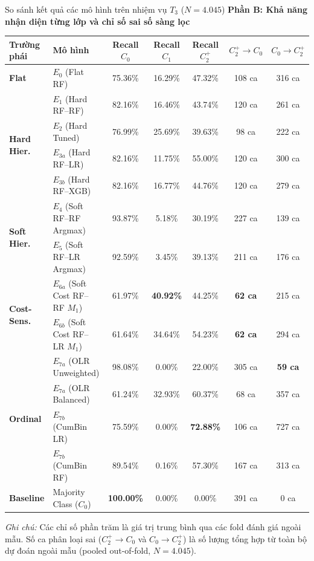 \begin{table}{So sánh kết quả các mô hình trên nhiệm vụ $T_3$ ($N = 4.045$)}
\vspace{0.35cm}
\textbf{Phần B: Khả năng nhận diện từng lớp và chỉ số sai số sàng lọc}
\vspace{0.15cm}

\begin{tabularx}{\textwidth}{l X c c c c c}
\toprule
\textbf{Trường phái} & \textbf{Mô hình} & \textbf{Recall $C_0$} & \textbf{Recall $C_1$} & \textbf{Recall $C_2^+$} & \textbf{$C_2^+ \to C_0$} & \textbf{$C_0 \to C_2^+$} \\
\midrule
\textbf{Flat} & $E_0$ (Flat RF) & 75.36\% & 16.29\% & 47.32\% & 108 ca & 316 ca \\
\midrule
\multirow{4}{*}{\textbf{Hard Hier.}} 
  & $E_1$ (Hard RF--RF)   & 82.16\% & 16.46\% & 43.74\% & 120 ca & 261 ca \\
  & $E_2$ (Hard Tuned)    & 76.99\% & 25.69\% & 39.63\% & 98 ca & 222 ca \\
  & $E_{3a}$ (Hard RF--LR) & 82.16\% & 11.75\% & 55.00\% & 120 ca & 300 ca \\
  & $E_{3b}$ (Hard RF--XGB)& 82.16\% & 16.77\% & 44.76\% & 120 ca & 279 ca \\
\midrule
\multirow{2}{*}{\textbf{Soft Hier.}} 
  & $E_4$ (Soft RF--RF Argmax) & 93.87\% & 5.18\% & 30.19\% & 227 ca & 139 ca \\
  & $E_5$ (Soft RF--LR Argmax) & 92.59\% & 3.45\% & 39.13\% & 211 ca & 176 ca \\
\midrule
\multirow{2}{*}{\textbf{Cost-Sens.}}
  & $E_{6a}$ (Soft Cost RF--RF $M_1$) & 61.97\% & \textbf{40.92\%} & 44.25\% & \textbf{62 ca} & 215 ca \\
  & $E_{6b}$ (Soft Cost RF--LR $M_1$) & 61.64\% & 34.64\% & 54.23\% & \textbf{62 ca} & 294 ca \\
\midrule
\multirow{4}{*}{\textbf{Ordinal}} 
  & $E_{7a}$ (OLR Unweighted) & 98.08\% & 0.00\% & 22.00\% & 305 ca & \textbf{59 ca} \\
  & $E_{7a}$ (OLR Balanced)   & 61.24\% & 32.93\% & 60.37\% & 68 ca & 357 ca \\
  & $E_{7b}$ (CumBin LR)      & 75.59\% & 0.00\% & \textbf{72.88\%} & 106 ca & 727 ca \\
  & $E_{7b}$ (CumBin RF)      & 89.54\% & 0.16\% & 57.30\% & 167 ca & 313 ca \\
\midrule
\textbf{Baseline} & Majority Class ($C_0$) & \textbf{100.00\%} & 0.00\% & 0.00\% & 391 ca & 0 ca \\
\bottomrule
\end{tabularx}

\vspace{0.15cm}
\raggedright
\scriptsize
\textit{Ghi chú:} Các chỉ số phần trăm là giá trị trung bình qua các fold đánh giá ngoài mẫu. Số ca phân loại sai ($C_2^+ \to C_0$ và $C_0 \to C_2^+$) là số lượng tổng hợp từ toàn bộ dự đoán ngoài mẫu (pooled out-of-fold, $N = 4.045$).
\end{table}
